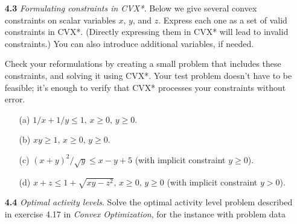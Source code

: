 \documentclass[11pt,a4paper]{article}
\begin{document}
\begin{itemize}
    \item[\textbf{4.3}] \textit{Formulating constraints in CVX*.} Below we give several convex constraints on scalar variables $x$, $y$, and $z$. Express each one as a set of valid constraints in CVX*. (Directly expressing them in CVX* will lead to invalid constraints.) You can also introduce additional variables, if needed.
    
    Check your reformulations by creating a small problem that includes these constraints, and solving it using CVX*. Your test problem doesn't have to be feasible; it's enough to verify that CVX* processes your constraints without error.

    \begin{itemize}
        \item[(a)] $1/x + 1/y \leq 1, \, x \geq 0, \, y \geq 0$.
        \item[(b)] $xy \geq 1, \, x \geq 0, \, y \geq 0$.
        \item[(c)] $(x+y)^2 / \sqrt{y} \leq x - y + 5$ (with implicit constraint $y \geq 0$).
        \item[(d)] $x + z \leq 1 + \sqrt{xy - z^2}, \, x \geq 0, \, y \geq 0$ (with implicit constraint $y > 0$).
    \end{itemize}

    \item[\textbf{4.4}] \textit{Optimal activity levels}. Solve the optimal activity level problem described in exercise 4.17 in \textit{Convex Optimization}, for the instance with problem data
    

\end{itemize}
\end{document}
